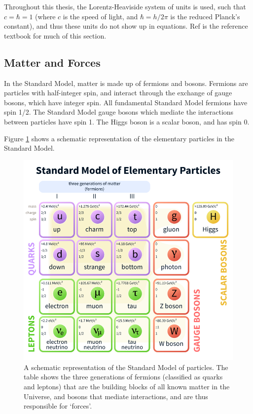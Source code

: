 \documentclass[12pt,a4paper,openright,twoside]{report}
\begin{document}
Throughout this thesis, the Lorentz-Heaviside system of units is used, such that $c=\hbar=1$ (where $c$ is the speed of light, and $\hbar=h/2\pi$ is the reduced Planck's constant), and thus these units do not show up in equations. Ref \cite{griff} is the reference textbook for much of this section.

\subsection{Matter and Forces}

In the Standard Model, matter is made up of fermions and bosons. Fermions are particles with half-integer spin, and interact through the exchange of gauge bosons, which have integer spin. All fundamental Standard Model fermions have spin 1/2. The Standard Model gauge bosons which mediate the interactions between particles have spin 1. The Higgs boson is a scalar boson, and has spin 0.

Figure \ref{fig:SM} shows a schematic representation of the elementary particles in the Standard Model.

\begin{figure}[H]
\centering
\includegraphics[width=0.8\linewidth]{standard_model.png}
\caption{A schematic representation of the Standard Model\cite{SM} of particles. The table shows the three generations of fermions (classified as quarks and leptons) that are the building blocks of all known matter in the Universe, and bosons that mediate interactions, and are thus responsible for `forces'.}
\label{fig:SM}
\end{figure}
\end{document}
